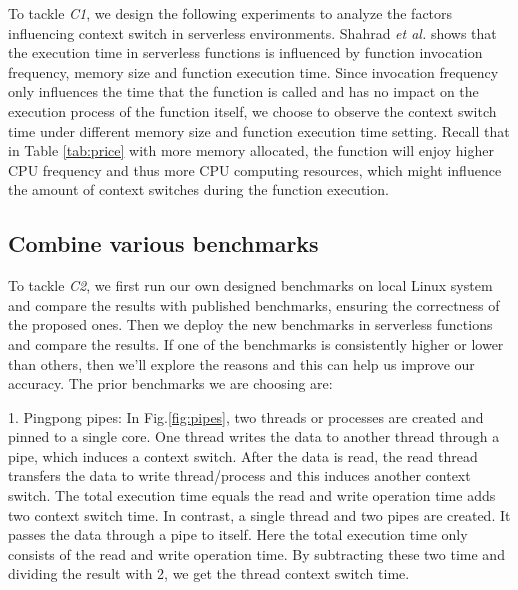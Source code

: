 	To tackle \emph{C1}, we design the following experiments to analyze the factors influencing context switch in serverless environments.
	Shahrad \emph{et al.} \cite{serverless-main} shows that the execution time in serverless functions is influenced by function invocation frequency, memory size and function execution time.
	Since invocation frequency only influences the time that the function is called and has no impact on the execution process of the function itself,
	we choose to observe the context switch time under different memory size and function execution time setting.
	Recall that in Table \ref{tab:price} with more memory allocated, the function will enjoy higher CPU frequency and thus more CPU computing resources, 
	which might influence the amount of context switches during the function execution.
	




\subsection{Combine various benchmarks}
	To tackle \emph{C2}, we first run our own designed benchmarks on local Linux system and compare the results with published benchmarks\cite{cs-lmbench,cs-pipes,cs-arm,cs-web},
	 ensuring the correctness of the proposed ones. Then we deploy the new benchmarks in serverless functions and compare the results. 
	 If one of the benchmarks is consistently higher or lower than others, then we'll explore the reasons and this can help us improve our accuracy.
	The prior benchmarks we are choosing are:
	
	1. Pingpong pipes\cite{cs-pipes,cs-web}: In Fig.\ref{fig:pipes}, two threads or processes are created and pinned to a single core. 
		      One thread writes the data to another thread through a pipe, which induces a context switch. 
			  After the data is read, the read thread transfers the data to write thread/process and this induces another context switch.
			  The total execution time equals the read and write operation time adds two context switch time.
			  In contrast, a single thread and two pipes are created. It passes the data through a pipe to itself. 
			  Here the total execution time only consists of the read and write operation time.
			  By subtracting these two time and dividing the result with 2, we get the thread context switch time.
	
